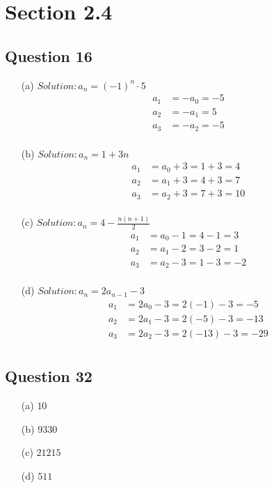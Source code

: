 \documentclass{article}
\begin{document}
\section*{Section 2.4}

\subsection*{Question 16}
\begin{itemize}
    \item[(a)] \( Solution: a_n = (-1)^n \cdot 5 \)
    \[
    \begin{aligned}
    a_1 &= -a_0 = -5 \\
    a_2 &= -a_1 = 5 \\
    a_3 &= -a_2 = -5 \\
    \end{aligned}
    \]

    \item[(b)] \( Solution: a_n = 1 + 3n \)
    \[
    \begin{aligned}
    a_1 &= a_0 + 3 = 1 + 3 = 4 \\
    a_2 &= a_1 + 3 = 4 + 3 = 7 \\
    a_3 &= a_2 + 3 = 7 + 3 = 10 \\
    \end{aligned}
    \]

    \item[(c)] \( Solution: a_n = 4 - \frac{n(n+1)}{2} \)
    \[
    \begin{aligned}
    a_1 &= a_0 - 1 = 4 - 1 = 3 \\
    a_2 &= a_1 - 2 = 3 - 2 = 1 \\
    a_3 &= a_2 - 3 = 1 - 3 = -2 \\
    \end{aligned}
    \]

    \item[(d)] \( Solution: a_n = 2a_{n-1} - 3 \)
    \[
    \begin{aligned}
    a_1 &= 2a_0 - 3 = 2(-1) - 3 = -5 \\
    a_2 &= 2a_1 - 3 = 2(-5) - 3 = -13 \\
    a_3 &= 2a_2 - 3 = 2(-13) - 3 = -29 \\
    \end{aligned}
    \]
\end{itemize}

\subsection*{Question 32}
\begin{itemize}
    \item[(a)] \( 10 \)
    \item[(b)] \( 9330 \)
    \item[(c)] \(21215 \)
    \item[(d)] \(511 \)
\end{itemize}
\end{document}
